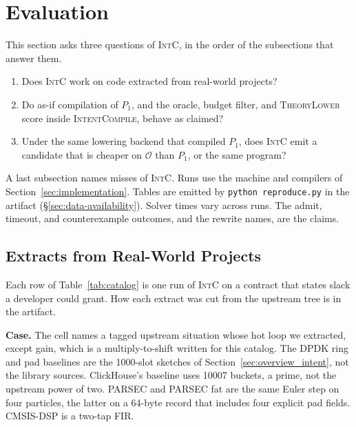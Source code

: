 \section{Evaluation}
\label{sec:evaluation}

This section asks three questions of \textsc{IntC}, in the order of the
subsections that answer them.
\begin{enumerate}
  \item Does \textsc{IntC} work on code extracted from real-world
  projects?
  \item Do as-if compilation of \(P_1\), and the oracle, budget filter, and
  \textsc{TheoryLower} score inside \textsc{IntentCompile}, behave as
  claimed?
  \item Under the same lowering backend that compiled \(P_1\), does
  \textsc{IntC} emit a candidate that is cheaper on
  \(\mathcal{O}\) than \(P_1\), or the same program?
\end{enumerate}
A last subsection names misses of \textsc{IntC}.
Runs use the machine and compilers of
Section~\ref{sec:implementation}. Tables are emitted by
\texttt{python reproduce.py} in the artifact
(\S\ref{sec:data-availability}). Solver times vary across runs. The
admit, timeout, and counterexample outcomes, and the rewrite names, are the
claims.

\subsection{Extracts from Real-World Projects}
\label{sec:catalog_table}

Each row of Table~\ref{tab:catalog} is one run of \textsc{IntC}
on a contract that states slack a developer could grant. How each extract
was cut from the upstream tree is in the artifact.

\begin{table}
\caption{One \textsc{IntC} run per row. Columns are the extract,
the catalog rule that fired, the harness bound \(K\), CBMC on \(P_1\) and
on the admitted program, and how that program compares to \(P_1\).}
\label{tab:catalog}

\end{table}

\textbf{Case.} The cell names a tagged upstream situation whose hot loop we
extracted, except gain, which is a multiply-to-shift written for this
catalog. The DPDK ring and pad baselines are the 1000-slot sketches of
Section~\ref{sec:overview_intent}, not the library sources. ClickHouse's
baseline uses 10007 buckets, a prime, not the upstream power of two.
PARSEC and PARSEC fat are the same Euler step on four particles, the
latter on a 64-byte record that includes four explicit pad fields.
CMSIS-DSP is a two-tap FIR.

